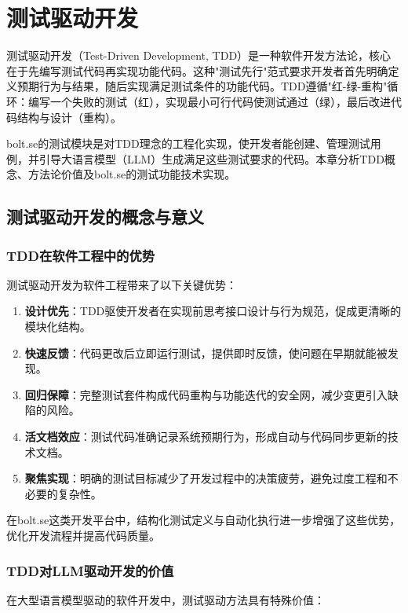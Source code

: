 
\chapter{测试驱动开发}

测试驱动开发（Test-Driven Development, TDD）是一种软件开发方法论，核心在于先编写测试代码再实现功能代码。这种"测试先行"范式要求开发者首先明确定义预期行为与结果，随后实现满足测试条件的功能代码。TDD遵循"红-绿-重构"循环：编写一个失败的测试（红），实现最小可行代码使测试通过（绿），最后改进代码结构与设计（重构）\cite{Beck2002}。

bolt.se的测试模块是对TDD理念的工程化实现，使开发者能创建、管理测试用例，并引导大语言模型（LLM）生成满足这些测试要求的代码。本章分析TDD概念、方法论价值及bolt.se的测试功能技术实现。

\section{测试驱动开发的概念与意义}

\subsection{TDD在软件工程中的优势}
测试驱动开发为软件工程带来了以下关键优势：

\begin{enumerate}
  \item \textbf{设计优先}：TDD驱使开发者在实现前思考接口设计与行为规范，促成更清晰的模块化结构。
  
  \item \textbf{快速反馈}：代码更改后立即运行测试，提供即时反馈，使问题在早期就能被发现。
  
  \item \textbf{回归保障}：完整测试套件构成代码重构与功能迭代的安全网，减少变更引入缺陷的风险。
  
  \item \textbf{活文档效应}：测试代码准确记录系统预期行为，形成自动与代码同步更新的技术文档。
  
  \item \textbf{聚焦实现}：明确的测试目标减少了开发过程中的决策疲劳，避免过度工程和不必要的复杂性。
\end{enumerate}

在bolt.se这类开发平台中，结构化测试定义与自动化执行进一步增强了这些优势，优化开发流程并提高代码质量。

\subsection{TDD对LLM驱动开发的价值}
在大型语言模型驱动的软件开发中，测试驱动方法具有特殊价值\cite{Mathews2024}：

